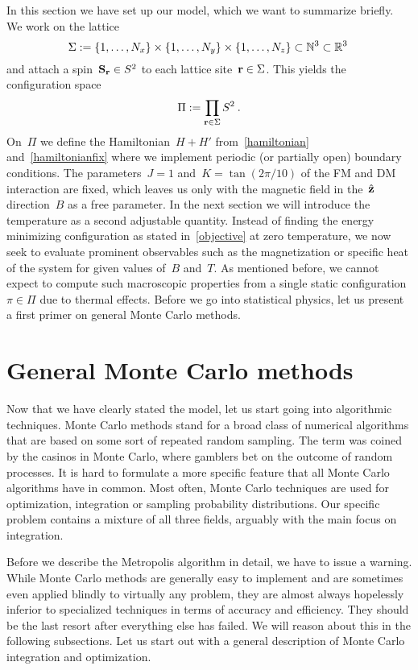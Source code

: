In this section we have set up our model, which we want to summarize briefly. We
work on the lattice
%
\begin{equation}
  \Sigma := \{1,\dots,N_x\} \times \{1,\dots,N_y\} \times
  \{1,\dots,N_z\} \subset \mathbb{N}^3 \subset \mathbb{R}^3\:
\end{equation}
%
and attach a spin~$\mathbf{S}_{\mathbf{r}} \in S^2$ to each lattice site~$\mathbf{r} \in \Sigma$. This
yields the configuration space
%
\begin{equation}
  \Pi := \prod_{\mathbf{r} \in \Sigma} S^2\:.
\end{equation}
%
On~$\Pi$ we define the Hamiltonian~$H+H'$ from~\eqref{hamiltonian}
and~\eqref{hamiltonianfix} where we implement periodic (or partially open)
boundary conditions. The parameters~$J=1$ and~$K=\tan(2\pi / 10)$ of the FM and
DM interaction are fixed, which leaves us only with the magnetic field in
the~$\hat{\mathbf{z}}$ direction~$B$ as a free parameter. In the next section we will
introduce the temperature as a second adjustable quantity. Instead of finding
the energy minimizing configuration as stated in~\eqref{objective} at zero
temperature, we now seek to evaluate prominent observables such as the
magnetization or specific heat of the system for given values of~$B$ and~$T$. As
mentioned before, we cannot expect to compute such macroscopic properties from a
single static configuration~$\pi \in \Pi$ due to thermal effects. Before we go
into statistical physics, let us present a first primer on general Monte Carlo
methods.
%
\section{General Monte Carlo methods}\label{sec:mctheory}
%
Now that we have clearly stated the model, let us start going into algorithmic
techniques. Monte Carlo methods stand for a broad class of numerical algorithms
that are based on some sort of repeated random sampling. The term was coined by
the casinos in Monte Carlo, where gamblers bet on the outcome of random
processes. It is hard to formulate a more specific feature that all Monte Carlo
algorithms have in common. Most often, Monte Carlo techniques are used for
optimization, integration or sampling probability distributions. Our specific
problem contains a mixture of all three fields, arguably with the main focus on
integration.

Before we describe the Metropolis algorithm in detail, we have to issue a
warning. While Monte Carlo methods are generally easy to implement and are
sometimes even applied blindly to virtually any problem, they are almost always
hopelessly inferior to specialized techniques in terms of accuracy and
efficiency. They should be the last resort after everything else has failed. We
will reason about this in the following subsections. Let us start out with a
general description of Monte Carlo integration and optimization.

